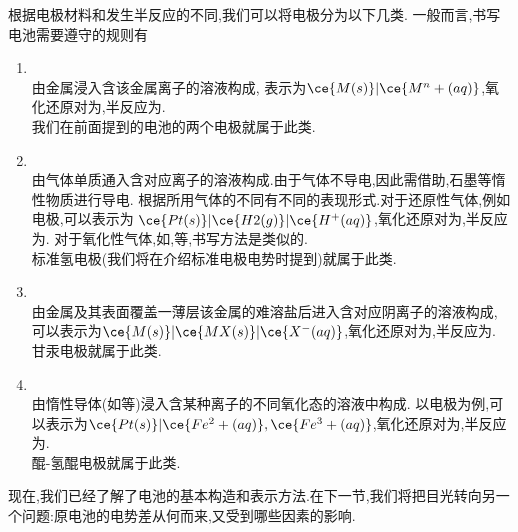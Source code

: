 \documentclass{ctexart}
\begin{document}
\begin{theorem}[6A.2.4 电极的种类]
    根据电极材料和发生半反应的不同,我们可以将电极分为以下几类.
    一般而言,书写电池需要遵守的规则有
    \begin{enumerate}[topsep=0pt,parsep=0pt,itemsep=0pt,partopsep=0pt,label=\tbf{(\arabic*)},leftmargin=*]
        \item {}\\
            由金属浸入含该金属离子的溶液构成,%
            表示为$\ce{M(s)}\vert\ce{M^n+(aq)}$,氧化还原对为,半反应为.\\
            我们在前面提到的电池的两个电极就属于此类.
        \item {}\\
            由气体单质通入含对应离子的溶液构成.由于气体不导电,因此需借助,石墨等惰性物质进行导电.%
            根据所用气体的不同有不同的表现形式.对于还原性气体,例如电极,可以表示为%
            $\ce{Pt(s)}\vert\ce{H2(g)}\vert\ce{H^+(aq)}$,氧化还原对为,半反应为.%
            对于氧化性气体,如,等,书写方法是类似的.\\
            标准氢电极(我们将在介绍标准电极电势时提到)就属于此类.
        \item {}\\
            由金属及其表面覆盖一薄层该金属的难溶盐后进入含对应阴离子的溶液构成,%
            可以表示为$\ce{M(s)}\vert\ce{MX(s)}\vert\ce{X^-(aq)}$,氧化还原对为,半反应为.\\
            甘汞电极就属于此类.
        \item {}\\
            由惰性导体(如等)浸入含某种离子的不同氧化态的溶液中构成.%
            以电极为例,可以表示为$\ce{Pt(s)}\vert\ce{Fe^2+(aq)},\ce{Fe^3+(aq)}$,氧化还原对为,半反应为.\\
            醌-氢醌电极就属于此类.
    \end{enumerate}
\end{theorem}
现在,我们已经了解了电池的基本构造和表示方法.在下一节,我们将把目光转向另一个问题:原电池的电势差从何而来,又受到哪些因素的影响.
\end{document}
